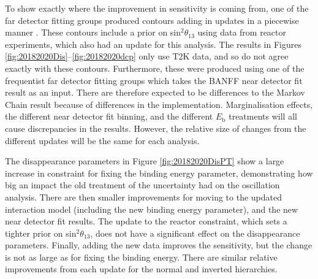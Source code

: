 To show exactly where the improvement in sensitivity is coming from, one of the far detector fitting groups produced contours adding in updates in a piecewise manner \cite{tn397}. These contours include a prior\cite{pdg} on sin$^2\theta_{13}$ using data from reactor experiments, which also had an update for this analysis. The results in Figures \ref{fig:20182020Dis}--\ref{fig:20182020dcp} only use T2K data, and so do not agree exactly with these contours. Furthermore, these were produced using one of the frequentist far detector fitting groups which takes the BANFF near detector fit result as an input. There are therefore expected to be differences to the Markov Chain result because of differences in the implementation. Marginalisation effects, the different near detector fit binning, and the different $E_{\mathrm{b}}$ treatments will all cause discrepancies in the results. However, the relative size of changes from the different updates will be the same for each analysis.

The disappearance parameters in Figure \ref{fig:20182020DisPT} show a large increase in constraint for fixing the binding energy parameter, demonstrating how big an impact the old treatment of the uncertainty had on the oscillation analysis. There are then smaller improvements for moving to the updated interaction model (including the new binding energy parameter), and the new near detector fit results. The update to the reactor constraint, which sets a tighter prior on sin$^2\theta_{13}$, does not have a significant effect on the disappearance parameters. Finally, adding the new \SK data improves the sensitivity, but the change is not as large as for fixing the binding energy. There are similar relative improvements from each update for the normal and inverted hierarchies. 

